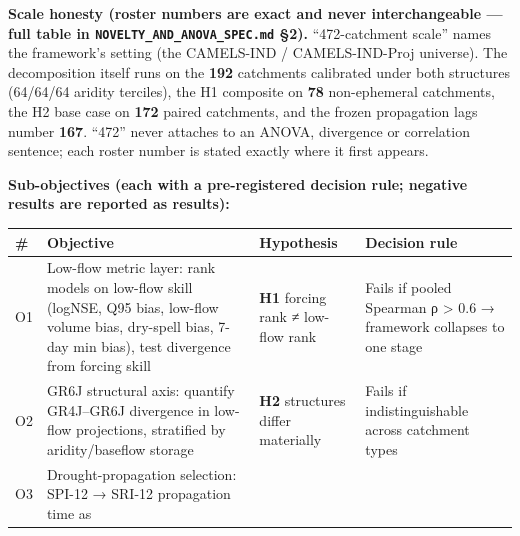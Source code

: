\documentclass[
  english,
  11pt,
]{article}
\newcounter{none} %
\begin{document}
\textbf{Scale honesty (roster numbers are exact and never
interchangeable --- full table in \texttt{NOVELTY\_AND\_ANOVA\_SPEC.md}
§2).} ``472-catchment scale'' names the framework's setting (the
CAMELS-IND / CAMELS-IND-Proj universe). The decomposition itself runs on
the \textbf{192} catchments calibrated under both structures (64/64/64
aridity terciles), the H1 composite on \textbf{78} non-ephemeral
catchments, the H2 base case on \textbf{172} paired catchments, and the
frozen propagation lags number \textbf{167}. ``472'' never attaches to
an ANOVA, divergence or correlation sentence; each roster number is
stated exactly where it first appears.

\textbf{Sub-objectives (each with a pre-registered decision rule;
negative results are reported as results):}

{\def\LTcaptype{none} %
\begin{longtable}[]{@{}
  >{\raggedright\arraybackslash}p{}
  >{\raggedright\arraybackslash}p{}
  >{\raggedright\arraybackslash}p{}
  >{\raggedright\arraybackslash}p{}@{}}
\toprule\noalign{}
\begin{minipage}[b]{\linewidth}\raggedright
\#
\end{minipage} & \begin{minipage}[b]{\linewidth}\raggedright
Objective
\end{minipage} & \begin{minipage}[b]{\linewidth}\raggedright
Hypothesis
\end{minipage} & \begin{minipage}[b]{\linewidth}\raggedright
Decision rule
\end{minipage} \\
\midrule\noalign{}
\endhead
\bottomrule\noalign{}
\endlastfoot
O1 & Low-flow metric layer: rank models on low-flow skill (logNSE, Q95
bias, low-flow volume bias, dry-spell bias, 7-day min bias), test
divergence from forcing skill & \textbf{H1} forcing rank ≠ low-flow rank
& Fails if pooled Spearman ρ \textgreater{} 0.6 → framework collapses to
one stage \\
O2 & GR6J structural axis: quantify GR4J--GR6J divergence in low-flow
projections, stratified by aridity/baseflow storage & \textbf{H2}
structures differ materially & Fails if indistinguishable across
catchment types \\
O3 & Drought-propagation selection: SPI-12 → SRI-12 propagation time as

\end{longtable}}
\end{document}
